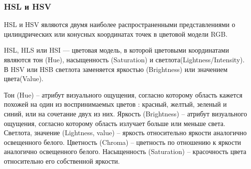 \subsubsection{HSL и HSV}
HSL и HSV являются двумя наиболее распространенными представлениями о цилиндрических или конусных координатах точек в цветовой модели RGB. 

HSL, HLS или HSI  — цветовая модель, в которой цветовыми координатами являются тон (Hue), насыщенность (Saturation) и светлота(Lightness/Intensity). В HSV или HSB светлота заменяется яркостью (Brightness) или значением цвета(Value).

\begin{figure}[ht!]
\end{figure}

Тон (Hue) -- атрибут визуального ощущения, согласно которому область кажется похожей на один из воспринимаемых цветов : красный, желтый, зеленый и синий, или на сочетание двух из них.
Яркость (Brightness) -- атрибут визуального ощущения, согласно которому область излучает больше или меньше света.
Светлота, значение (Lightness, value) -- яркость относительно яркости аналогично освещенного белого.
Цветность (Chroma) -- цветность по отношению к яркости аналогично освещенного белого.
Насыщенность (Saturation) -- красочность цвета относительно его собственной яркости.




